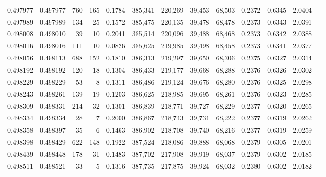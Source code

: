 \begin{tabular}{rrrrrrrrrrrrr}
0.497977 & 0.497977 &   760 &   165 &                                     0.1784 & 385,341 & 220,269 &  39,453 &  68,503 & 0.2372 & 0.6345 & 2.0404 \\
0.497989 & 0.497989 &   134 &    25 &                                     0.1572 & 385,475 & 220,135 &  39,478 &  68,478 & 0.2373 & 0.6343 & 2.0391 \\
0.498008 & 0.498010 &    39 &    10 &                                     0.2041 & 385,514 & 220,096 &  39,488 &  68,468 & 0.2373 & 0.6342 & 2.0388 \\
0.498016 & 0.498016 &   111 &    10 &                                     0.0826 & 385,625 & 219,985 &  39,498 &  68,458 & 0.2373 & 0.6341 & 2.0377 \\
0.498056 & 0.498113 &   688 &   152 &                                     0.1810 & 386,313 & 219,297 &  39,650 &  68,306 & 0.2375 & 0.6327 & 2.0314 \\
0.498192 & 0.498192 &   120 &    18 &                                     0.1304 & 386,433 & 219,177 &  39,668 &  68,288 & 0.2376 & 0.6326 & 2.0302 \\
0.498229 & 0.498229 &    53 &     8 &                                     0.1311 & 386,486 & 219,124 &  39,676 &  68,280 & 0.2376 & 0.6325 & 2.0298 \\
0.498243 & 0.498261 &   139 &    19 &                                     0.1203 & 386,625 & 218,985 &  39,695 &  68,261 & 0.2376 & 0.6323 & 2.0285 \\
0.498309 & 0.498331 &   214 &    32 &                                     0.1301 & 386,839 & 218,771 &  39,727 &  68,229 & 0.2377 & 0.6320 & 2.0265 \\
0.498334 & 0.498334 &    28 &     7 &                                     0.2000 & 386,867 & 218,743 &  39,734 &  68,222 & 0.2377 & 0.6319 & 2.0262 \\
0.498358 & 0.498397 &    35 &     6 &                                     0.1463 & 386,902 & 218,708 &  39,740 &  68,216 & 0.2377 & 0.6319 & 2.0259 \\
0.498398 & 0.498429 &   622 &   148 &                                     0.1922 & 387,524 & 218,086 &  39,888 &  68,068 & 0.2379 & 0.6305 & 2.0201 \\
0.498439 & 0.498448 &   178 &    31 &                                     0.1483 & 387,702 & 217,908 &  39,919 &  68,037 & 0.2379 & 0.6302 & 2.0185 \\
0.498511 & 0.498521 &    33 &     5 &                                     0.1316 & 387,735 & 217,875 &  39,924 &  68,032 & 0.2380 & 0.6302 & 2.0182 \\

\end{tabular}
